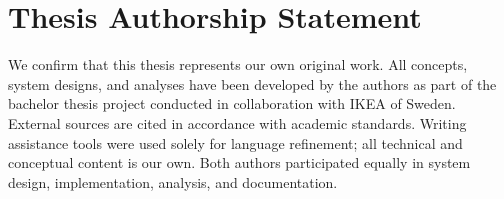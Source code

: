 \section{Thesis Authorship Statement}
\label{sec:authorship}

We confirm that this thesis represents our own original work. All concepts, system designs,
and analyses have been developed by the authors as part of the bachelor thesis project
conducted in collaboration with IKEA of Sweden. External sources are cited in accordance
with academic standards. Writing assistance tools were used solely for language refinement;
all technical and conceptual content is our own. Both authors participated equally in
system design, implementation, analysis, and documentation.
